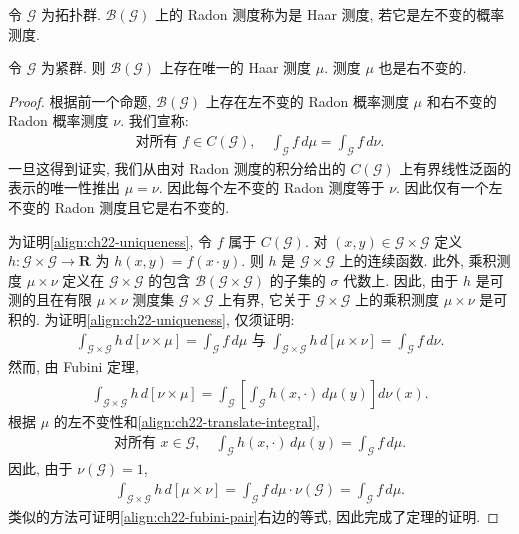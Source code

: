 \documentclass[../../main.tex]{subfiles}
\begin{document}
\begin{definition}[Haar 测度]\label{definition:ch22-haar}
令 $\mathcal{G}$ 为拓扑群. $\mathcal{B}(\mathcal{G})$ 上的 Radon 测度称为是 Haar 测度, 若它是左不变的概率测度.
\end{definition}

\begin{theorem}\label{theorem:ch22-von-neumann}
令 $\mathcal{G}$ 为紧群. 则 $\mathcal{B}(\mathcal{G})$ 上存在唯一的 Haar 测度 $\mu$. 测度 $\mu$ 也是右不变的.
\end{theorem}

\begin{proof}
根据前一个命题, $\mathcal{B}(\mathcal{G})$ 上存在左不变的 Radon 概率测度 $\mu$ 和右不变的 Radon 概率测度 $\nu$. 我们宣称:
\begin{align}
\text{对所有 }f\in C(\mathcal{G}),\quad\int_{\mathcal{G}}f\,d\mu=\int_{\mathcal{G}}f\,d\nu.
\label{align:ch22-uniqueness}
\end{align}
一旦这得到证实, 我们从由对 Radon 测度的积分给出的 $C(\mathcal{G})$ 上有界线性泛函的表示的唯一性推出 $\mu=\nu$. 因此每个左不变的 Radon 测度等于 $\nu$. 因此仅有一个左不变的 Radon 测度且它是右不变的.

为证明\eqref{align:ch22-uniqueness}, 令 $f$ 属于 $C(\mathcal{G})$. 对 $(x,y)\in\mathcal{G}\times\mathcal{G}$ 定义 $h:\mathcal{G}\times\mathcal{G}\to\mathbf{R}$ 为 $h(x,y)=f(x\cdot y)$. 则 $h$ 是 $\mathcal{G}\times\mathcal{G}$ 上的连续函数. 此外, 乘积测度 $\mu\times\nu$ 定义在 $\mathcal{G}\times\mathcal{G}$ 的包含 $\mathcal{B}(\mathcal{G}\times\mathcal{G})$ 的子集的 $\sigma$ 代数上. 因此, 由于 $h$ 是可测的且在有限 $\mu\times\nu$ 测度集 $\mathcal{G}\times\mathcal{G}$ 上有界, 它关于 $\mathcal{G}\times\mathcal{G}$ 上的乘积测度 $\mu\times\nu$ 是可积的. 为证明\eqref{align:ch22-uniqueness}, 仅须证明:
\begin{align}
\int_{\mathcal{G}\times\mathcal{G}}h\,d[\nu\times\mu]=\int_{\mathcal{G}}f\,d\mu\text{ 与 }\int_{\mathcal{G}\times\mathcal{G}}h\,d[\mu\times\nu]=\int_{\mathcal{G}}f\,d\nu.
\label{align:ch22-fubini-pair}
\end{align}
然而, 由 Fubini 定理,
\begin{align*}
\int_{\mathcal{G}\times\mathcal{G}}h\,d[\nu\times\mu]=\int_{\mathcal{G}}\left[\int_{\mathcal{G}}h(x,\cdot)\,d\mu(y)\right]d\nu(x).
\end{align*}
根据 $\mu$ 的左不变性和\eqref{align:ch22-translate-integral},
\begin{align*}
\text{对所有 }x\in\mathcal{G},\quad\int_{\mathcal{G}}h(x,\cdot)\,d\mu(y)=\int_{\mathcal{G}}f\,d\mu.
\end{align*}
因此, 由于 $\nu(\mathcal{G})=1$,
\begin{align*}
\int_{\mathcal{G}\times\mathcal{G}}h\,d[\mu\times\nu]=\int_{\mathcal{G}}f\,d\mu\cdot\nu(\mathcal{G})=\int_{\mathcal{G}}f\,d\mu.
\end{align*}
类似的方法可证明\eqref{align:ch22-fubini-pair}右边的等式, 因此完成了定理的证明.
\end{proof}
\end{document}

